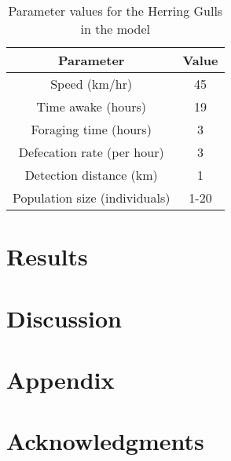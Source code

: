 \documentclass[a4paper,12pt]{article}
\begin{document}
\begin{table}
\centering
\caption{Parameter values for the Herring Gulls in the model}
\label{parameter-table}
\begin{tabular}{cc}
\hline
\textbf{Parameter}            & \textbf{Value} \\ \hline
Speed (km/hr)                 & 45             \\
Time awake (hours)            & 19             \\
Foraging time (hours)         & 3              \\
Defecation rate (per hour)    & 3              \\
Detection distance (km)       & 1              \\ 
Population size (individuals) & 1-20           \\ \hline
\end{tabular}
\end{table}

\section*{Results}

\section*{Discussion}


\section*{Appendix}

\section*{Acknowledgments}

\newpage



\end{document}
